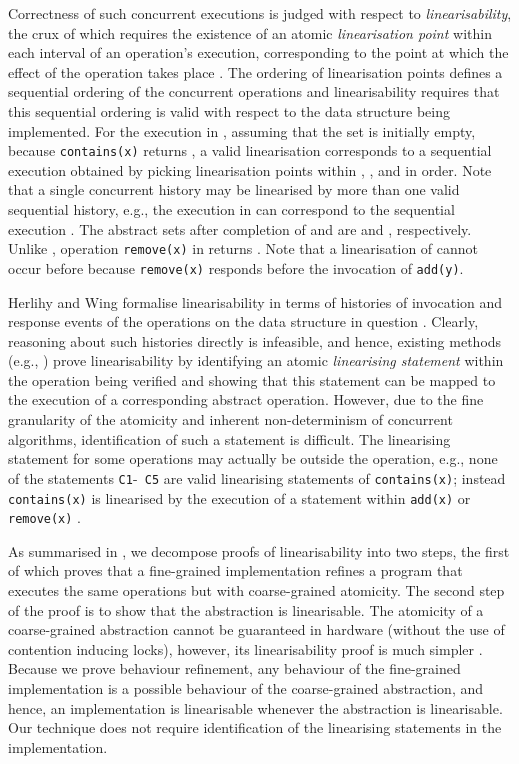 \documentclass{article}
\theoremstyle{plain}
\newcounter{thm}
\theoremstyle{definition}
\begin{document}
Correctness of such concurrent executions is judged with respect to
\emph{linearisability}, the crux of which requires the existence of an
atomic \emph{linearisation point} within each interval of an
operation's execution, corresponding to the point at which the effect
of the operation takes place \cite{Herlihy90}. The ordering of
linearisation points defines a sequential ordering of the concurrent
operations and linearisability requires that this sequential ordering
is valid with respect to the data structure being implemented.  For
the execution in , assuming that the set is initially
empty, because {\tt contains(x)} returns , a valid linearisation
corresponds to a sequential execution  obtained by picking linearisation
points within , ,  and  in
order. Note that a single concurrent history may be linearised by more
than one valid sequential history, e.g., the execution in
 can correspond to the sequential execution . The abstract
sets after completion of  and  are  and
, respectively. Unlike , operation {\tt remove(x)} in
 returns . Note that a linearisation of 
cannot occur before  because {\tt remove(x)} responds before
the invocation of {\tt add(y)}.

Herlihy and Wing formalise linearisability in terms of histories of
invocation and response events of the operations on the data structure
in question \cite{Herlihy90}. Clearly, reasoning about such histories
directly is infeasible, and hence, existing methods (e.g.,
\cite{CGLM06,DSW11,VHHS06}) prove linearisability by identifying an
atomic {\em linearising statement} within the operation being verified
and showing that this statement can be mapped to the execution of a
corresponding abstract operation.  However, due to the fine
granularity of the atomicity and inherent non-determinism of
concurrent algorithms, identification of such a statement is
difficult. The linearising statement for some operations may actually
be outside the operation, e.g., none of the statements {\tt C1}-{\tt
  C5} are valid linearising statements of {\tt contains(x)}; instead
{\tt contains(x)} is linearised by the execution of a statement within
{\tt add(x)} or {\tt remove(x)} \cite{DSW11}.


As summarised in , we decompose proofs of
linearisability into two steps, the first of which proves that a
fine-grained implementation refines a program that executes the same
operations but with coarse-grained atomicity. The second step of the
proof is to show that the abstraction is linearisable. The atomicity
of a coarse-grained abstraction cannot be guaranteed in hardware
(without the use of contention inducing locks), however, its
linearisability proof is much simpler \cite{DDH12}. Because we prove
behaviour refinement, any behaviour of the fine-grained implementation
is a possible behaviour of the coarse-grained abstraction, and hence,
an implementation is linearisable whenever the abstraction is
linearisable. Our technique does not require identification of the
linearising statements in the implementation.
\end{document}
